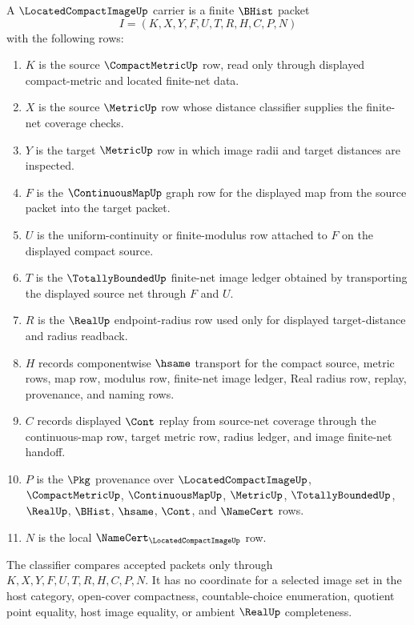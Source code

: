 \begin{definition}
\label{def:located-compact-image-carrier}
A $\LocatedCompactImageUp$ carrier is a finite $\BHist$ packet
$$
I=(K,X,Y,F,U,T,R,H,C,P,N)
$$
with the following rows:
\begin{enumerate}
\item $K$ is the source $\CompactMetricUp$ row, read only through displayed compact-metric and located finite-net data.
\item $X$ is the source $\MetricUp$ row whose distance classifier supplies the finite-net coverage checks.
\item $Y$ is the target $\MetricUp$ row in which image radii and target distances are inspected.
\item $F$ is the $\ContinuousMapUp$ graph row for the displayed map from the source packet into the target packet.
\item $U$ is the uniform-continuity or finite-modulus row attached to $F$ on the displayed compact source.
\item $T$ is the $\TotallyBoundedUp$ finite-net image ledger obtained by transporting the displayed source net through $F$ and $U$.
\item $R$ is the $\RealUp$ endpoint-radius row used only for displayed target-distance and radius readback.
\item $H$ records componentwise $\hsame$ transport for the compact source, metric rows, map row, modulus row, finite-net image ledger, Real radius row, replay, provenance, and naming rows.
\item $C$ records displayed $\Cont$ replay from source-net coverage through the continuous-map row, target metric row, radius ledger, and image finite-net handoff.
\item $P$ is the $\Pkg$ provenance over $\LocatedCompactImageUp$, $\CompactMetricUp$, $\ContinuousMapUp$, $\MetricUp$, $\TotallyBoundedUp$, $\RealUp$, $\BHist$, $\hsame$, $\Cont$, and $\NameCert$ rows.
\item $N$ is the local $\NameCert_{\LocatedCompactImageUp}$ row.
\end{enumerate}
The classifier compares accepted packets only through $K,X,Y,F,U,T,R,H,C,P,N$. It has no coordinate for a selected image set in the host category, open-cover compactness, countable-choice enumeration, quotient point equality, host image equality, or ambient $\RealUp$ completeness.
\end{definition}

